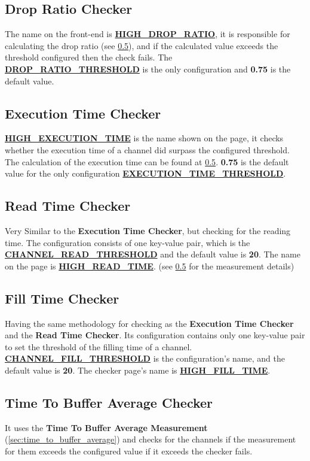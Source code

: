 \subsection{Drop Ratio Checker}
The name on the front-end is \textbf{\url{HIGH_DROP_RATIO}}, it is responsible for calculating the drop ratio
(see \ref{}), and if the calculated value exceeds the threshold configured then the check fails. The 
\textbf{\url{DROP_RATIO_THRESHOLD}} is the only configuration and \textbf{0.75} is the default value.

\subsection{Execution Time Checker}
\textbf{\url{HIGH_EXECUTION_TIME}} is the name shown on the page, it checks whether the execution time of a channel
did surpass the configured threshold. The calculation of the execution time can be found at \ref{}. \textbf{0.75}
is the default value for the only configuration \textbf{\url{EXECUTION_TIME_THRESHOLD}}.

\subsection{Read Time Checker}
Very Similar to the \textbf{Execution Time Checker}, but checking for the reading time. The configuration
consists of one key-value pair, which is the \textbf{\url{CHANNEL_READ_THRESHOLD}} and the default value is 
\textbf{20}. The name on the page is \textbf{\url{HIGH_READ_TIME}}. (see \ref{} for the measurement details)

\subsection{Fill Time Checker}
Having the same methodology for checking as the \textbf{Execution Time Checker} and the \textbf{Read Time Checker}.
Its configuration contains only one key-value pair to set the threshold of the filling time of a channel.
\textbf{\url{CHANNEL_FILL_THRESHOLD}} is the configuration's name, and the default value is \textbf{20}. The checker page's
name is \textbf{\url{HIGH_FILL_TIME}}.

\subsection{Time To Buffer Average Checker}
It uses the \textbf{Time To Buffer Average Measurement} (\ref{sec:time_to_buffer_average}) and checks
for the channels if the measurement for them exceeds the configured value if it exceeds the checker
fails.

